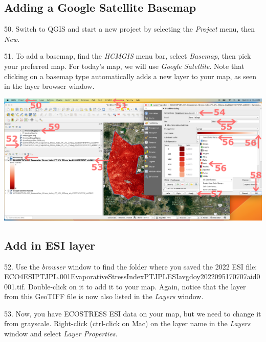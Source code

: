 \documentclass[oneside,a4paper,11pt,explicit]{book}
\begin{document}
\subsection{Adding a Google Satellite Basemap}

50. Switch to QGIS and start a new project by selecting the \textit{Project} menu, then \textit{New}.

51. To add a basemap, find the \textit{HCMGIS} menu bar, select \textit{Basemap}, then pick your preferred map. For today's map, we will use \textit{Google Satellite}. Note that clicking on a basemap type automatically adds a new layer to your map, as seen in the layer browser window.

\vspace{.5em}

\centerline{\includegraphics[width=\textwidth]{addESIlayer.png}}

\subsection{Add in ESI layer}

52. Use the \textit{browser} window to find the folder where you saved the 2022 ESI file: \\ ECO4ESIPTJPL.001\textunderscore Evaporative\textunderscore Stress\textunderscore Index\textunderscore PT\textunderscore JPL\textunderscore ESIavg\textunderscore doy2022095170707\textunderscore aid0001.tif. Double-click on it to add it to your map. Again, notice that the layer from this GeoTIFF file is now also listed in the \textit{Layers} window.


53. Now, you have ECOSTRESS ESI data on your map, but we need to change it from grayscale. Right-click (ctrl-click on Mac) on the layer name in the \textit{Layers} window and select \textit{Layer Properties}. 
\end{document}
